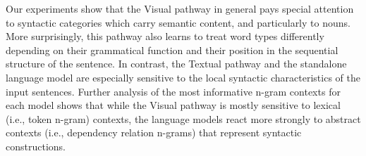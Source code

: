 Our experiments show that the {\sc Visual} pathway in general
pays special attention to syntactic categories which carry semantic
content, and particularly to nouns. More surprisingly, this pathway also
learns to treat word types differently depending on their
grammatical function and their position in the sequential structure of
the sentence. In contrast, the {\sc Textual} pathway and the standalone
language model are especially sensitive to the local syntactic
characteristics of the input sentences.  Further analysis of the most
informative n-gram contexts for each model shows that while the
{\sc Visual} pathway is mostly sensitive to lexical (i.e., token n-gram)
contexts, the language models react more strongly to abstract contexts
(i.e., dependency relation n-grams) that represent syntactic constructions.
